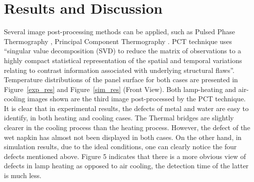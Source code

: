 \documentclass{tQRT2e}
\begin{document}
\section{Results and Discussion}
Several image post-processing methods can be applied, such as Pulsed Phase Thermography \cite{Maldague1996}, Principal Component Thermography \cite{Rajic2002}. PCT technique uses “singular value decomposition (SVD) to reduce the matrix of observations to a highly compact statistical representation of the spatial and temporal variations relating to contrast information associated with underlying structural flaws”. Temperature distributions of the panel surface for both cases are presented in Figure~\ref{exp_res} and Figure~\ref{sim_res} (Front View). Both lamp-heating and air-cooling images shown are the third image post-processed by the PCT technique. It is clear that in experimental results, the defects of metal and water are easy to identify, in both heating and cooling cases. The Thermal bridges are slightly clearer in the cooling process than the heating process. However, the defect of the wet napkin has almost not been displayed in both cases. On the other hand, in simulation results, due to the ideal conditions, one can clearly notice the four defects mentioned above. Figure 5 indicates that there is a more obvious view of defects in lamp heating as opposed to air cooling, the detection time of the latter is much less.
\end{document}
